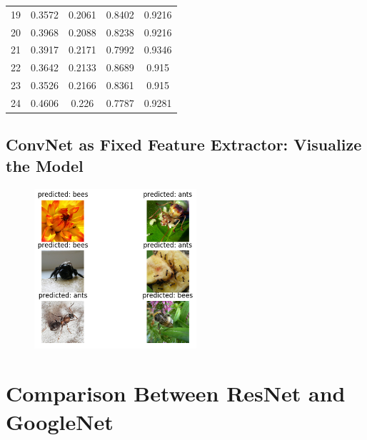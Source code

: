 \documentclass[12pt]{article}
\begin{document}
\begin{table}[h]
{\begin{tabular}{lcccc}
				19    & 0.3572     & 0.2061           & 0.8402         & 0.9216              \\
				20    & 0.3968     & 0.2088           & 0.8238         & 0.9216              \\
				21    & 0.3917     & 0.2171           & 0.7992         & 0.9346              \\
				22    & 0.3642     & 0.2133           & 0.8689         & 0.915               \\
				23    & 0.3526     & 0.2166           & 0.8361         & 0.915               \\
				24    & 0.4606     & 0.226            & 0.7787         & 0.9281              \\ \hline
			\end{tabular}
		}
	\end{table}
	
	
	\subsection{ConvNet as Fixed Feature Extractor: Visualize the Model}
	
	\begin{figure}[h]
		\centering
		\includegraphics[width=6cm]{Figure_6.png}
		\captionsetup{justification=centering,margin=1cm}
		\label{fig:sub1}
	\end{figure}

	\newpage
	
	\section{Comparison Between ResNet and GoogleNet}
	
\end{document}
